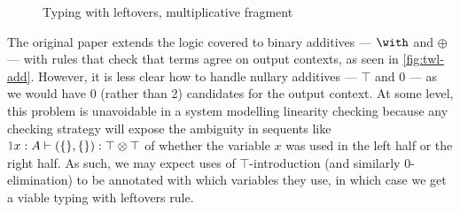 \begin{figure}
  \caption{Typing with leftovers, multiplicative fragment}
  \label{fig:twl-mult}
\end{figure}

The original paper extends the logic covered to binary additives --- $\with$ and
$\oplus$ --- with rules that check that terms agree on output contexts, as seen
in \cref{fig:twl-add}.
However, it is less clear how to handle nullary additives --- $\top$ and $0$ ---
as we would have 0 (rather than 2) candidates for the output context.
At some level, this problem is unavoidable in a system modelling linearity
checking because any checking strategy will expose the ambiguity in sequents
like $\gr1x : A \vdash (\{\}, \{\}) : \top \otimes \top$ of whether the variable
$x$ was used in the left half or the right half.
As such, we may expect uses of $\top$-introduction (and similarly
$0$-elimination) to be annotated with which variables they use, in which case we
get a viable typing with leftovers rule.

